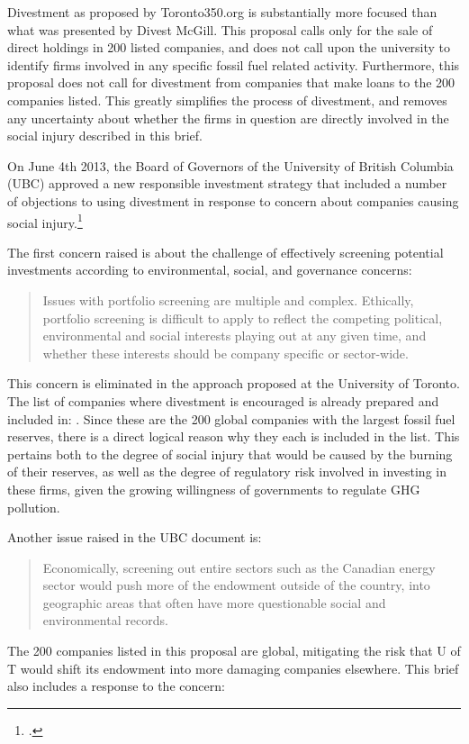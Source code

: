 Divestment as proposed by Toronto350.org is substantially more focused than what was presented by Divest McGill.
This proposal calls only for the sale of direct holdings in 200 listed companies, and does not call upon the university to identify firms involved in any specific fossil fuel related activity.
Furthermore, this proposal does not call for divestment from companies that make loans to the 200 companies listed.
This greatly simplifies the process of divestment, and removes any uncertainty about whether the firms in question are directly involved in the social injury described in this brief.



On June 4th 2013, the Board of Governors of the University of British Columbia (UBC) approved a new responsible investment strategy that included a number of objections to using divestment in response to concern about companies causing social injury.\footcite[][]{UBCRespInv}



The first concern raised is about the challenge of effectively screening potential investments according to environmental, social, and governance concerns:
\begin{quote}
Issues with portfolio screening are multiple and complex. Ethically, portfolio screening is difficult to apply to reflect the competing political, environmental and social interests playing out at any given time, and whether these interests should be company specific or sector-wide.
\end{quote}
This concern is eliminated in the approach proposed at the University of Toronto.
The list of companies where divestment is encouraged is already prepared and included in: .
Since these are the 200 global companies with the largest fossil fuel reserves, there is a direct logical reason why they each is included in the list.
This pertains both to the degree of social injury that would be caused by the burning of their reserves, as well as the degree of regulatory risk involved in investing in these firms, given the growing willingness of governments to regulate GHG pollution.



Another issue raised in the UBC document is:
\begin{quote}
Economically, screening out entire sectors such as the Canadian energy sector would push more of the endowment outside of the country, into geographic areas that often have more questionable social and environmental records.
\end{quote}
The 200 companies listed in this proposal are global, mitigating the risk that U of T would shift its endowment into more damaging companies elsewhere.
This brief also includes a response to the concern: 



